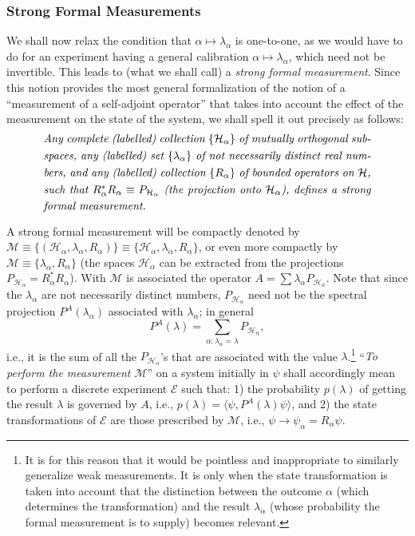 \documentclass[12pt]{article}
\newcommand{\sa}{self-adjoint}
\renewcommand{\a}{\alpha}
\newcommand{\la}{\lambda_{\a}}
\newcommand{\psia}{\psi_{\a}}
\newcommand{\Ha}{{\H}_{\a}}
\renewcommand{\H}{\mbox{$\mathcal{H}$}}
\newcommand{\Pa}{ P_{ {\mathcal{H}_{\a} } } }
\newcommand{\Aa}{R_{\a}}
\newcommand{\E}{\mbox{$\mathscr{E}$}}
\newcommand{\M}{\mbox{$\mathcal{M}$}}
\begin{document}
\subsubsection{Strong Formal Measurements}
\label{sec:StrM}

We shall now relax the condition that $\a\mapsto \la$ is one-to-one,
as we would have to do for an experiment having a general calibration
$\a\mapsto\la$, which need not be invertible. This leads to (what we
shall call) a \emph{strong formal measurement}.  Since this notion
provides the most general formalization of the notion of a
``measurement of a \sa{} operator'' that takes into account the effect
of the measurement on the state of the system, we shall spell it out
precisely as follows:
\begin{equation}
\mbox{%
   \begin{minipage}{0.85\textwidth}\openup 1.4\jot
     \setlength{\baselineskip}{12pt}\emph{Any complete (labelled)
       collection $\{ \Ha\}$ of mutually orthogonal subspaces, any
       (labelled) set $\{\la \}$ of not necessarily distinct real
       numbers, and any (labelled) collection $\{\Aa\}$ of bounded
       operators on $\H$, such that $\Aa^{\ast}\Aa\equiv\Pa$ (the
       projection onto $\Ha$), defines a strong formal measurement.}
   \end{minipage}}
\label{def:sfm}
\end{equation}

A strong formal measurement will be compactly denoted by $\M\equiv
\{(\Ha, \la, \Aa) \}\equiv\{\Ha, \la, \Aa \}$, or even more compactly
by $\M\equiv \{\la, \Aa \}$ (the spaces $\Ha$ can be extracted {}from
the projections $\Pa= \Aa^{\ast}\Aa$).  With \M{} is associated the
operator $A=\sum\la\Pa$.  Note that since the $\la$ are not
necessarily distinct numbers, $\Pa$ need not be the spectral
projection $P^A (\la)$ associated with $\la$; in general $$P^A
(\lambda) = \sum_{\a: \la =\lambda}\Pa,$$
i.e., it is the sum of all
the $\Pa$'s that are associated with the value $\lambda$.\footnote{ It
   is for this reason that it would be pointless and inappropriate to
   similarly generalize weak measurements. It is only when the state
   transformation is taken into account that the distinction between
   the outcome $\a$ (which determines the transformation) and the
   result $\la$ (whose probability the formal measurement is to supply)
   becomes relevant.}  ``\emph{To perform the measurement $\M$}'' on a
system initially in $\psi$ shall accordingly mean to perform a
discrete experiment \E{} such that: 1) the probability $p(\lambda)$ of
getting the result $\lambda$ is governed by $A$, i.e., $ p(\lambda) =
\langle \psi, P^A (\lambda) \psi \rangle$, and 2) the state
transformations of \E{} are those prescribed by \M{}, i.e., $ \psi \to
\psia= \Aa\psi$.
\end{document}
